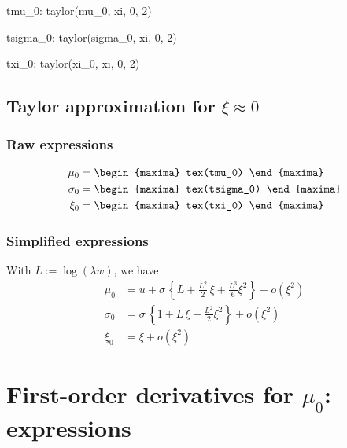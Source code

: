 {\footnotesize
\begin{maxima}
  tmu_0: taylor(mu_0, xi, 0, 2)
\end{maxima}
\begin{maxima}
  tsigma_0: taylor(sigma_0, xi, 0, 2)
\end{maxima}
\begin{maxima}
  txi_0: taylor(xi_0, xi, 0, 2)
\end{maxima}
}

\subsection{Taylor approximation for $\xi \approx 0$}

\subsubsection*{Raw expressions}

{\color{MonVertF}
\begin{align*}
\mu_0 &= 
\begin{maxima}
  tex(tmu_0)
\end{maxima} \\
\sigma_0 &= 
\begin{maxima}
  tex(tsigma_0)
\end{maxima}\\
  \xi_0 &= 
\begin{maxima}
  tex(txi_0)
\end{maxima}
\end{align*}
}

\subsubsection*{Simplified expressions}
With $L:= \log(\lambda w)$, we have
{\color{red}
\begin{align*}
  \mu_0 &= u + \sigma \, \left\{ L + \frac{L^2}{2} \,\xi + \frac{L^3}{6}\xi^2 \right\} + o(\xi^2) \\
  \sigma_0 &= \sigma \,  \left\{ 1 + L \,\xi + \frac{L^2}{2}\xi^2 \right\} + o(\xi^2) \\
  \xi_0 &= \xi + o(\xi^2)
\end{align*}
}


\section{First-order derivatives for $\mu_0$: expressions}

